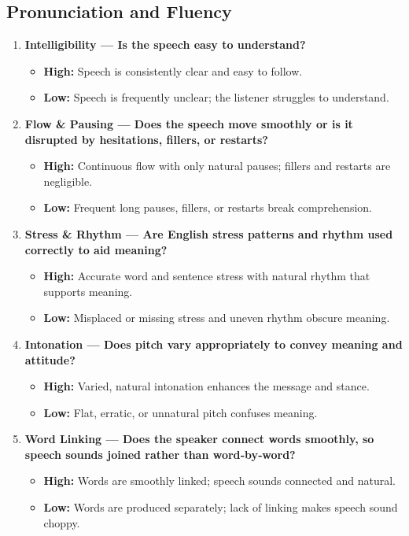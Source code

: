 \documentclass{report}
\begin{document}
\subsection*{Pronunciation and Fluency}
\begin{enumerate}
  \item \textbf{Intelligibility — Is the speech easy to understand?}
  \begin{itemize}
    \item \textbf{High:} Speech is consistently clear and easy to follow.
    \item \textbf{Low:} Speech is frequently unclear; the listener struggles to understand.
  \end{itemize}

  \item \textbf{Flow \& Pausing — Does the speech move smoothly or is it disrupted by hesitations, fillers, or restarts?}
  \begin{itemize}
    \item \textbf{High:} Continuous flow with only natural pauses; fillers and restarts are negligible.
    \item \textbf{Low:} Frequent long pauses, fillers, or restarts break comprehension.
  \end{itemize}

  \item \textbf{Stress \& Rhythm — Are English stress patterns and rhythm used correctly to aid meaning?}
  \begin{itemize}
    \item \textbf{High:} Accurate word and sentence stress with natural rhythm that supports meaning.
    \item \textbf{Low:} Misplaced or missing stress and uneven rhythm obscure meaning.
  \end{itemize}

  \item \textbf{Intonation — Does pitch vary appropriately to convey meaning and attitude?}
  \begin{itemize}
    \item \textbf{High:} Varied, natural intonation enhances the message and stance.
    \item \textbf{Low:} Flat, erratic, or unnatural pitch confuses meaning.
  \end{itemize}

  \item \textbf{Word Linking — Does the speaker connect words smoothly, so speech sounds joined rather than word‑by‑word?}
  \begin{itemize}
    \item \textbf{High:} Words are smoothly linked; speech sounds connected and natural.
    \item \textbf{Low:} Words are produced separately; lack of linking makes speech sound choppy.
  \end{itemize}


\end{enumerate}
\end{document}

